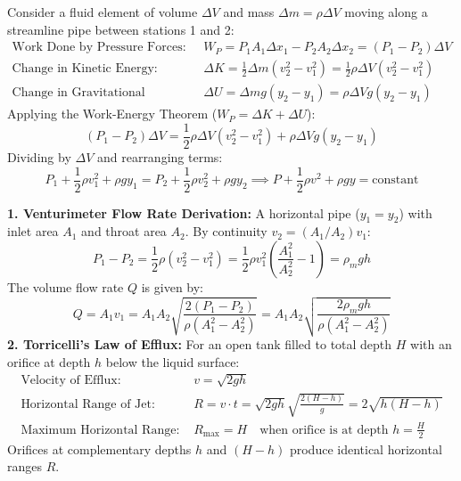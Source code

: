 \documentclass[10pt,a4paper]{article}
\begin{document}
\begin{formulabox}
Consider a fluid element of volume $\Delta V$ and mass $\Delta m = \rho\Delta V$ moving along a streamline pipe between stations 1 and 2:
\begin{align}
  \text{Work Done by Pressure Forces: } &W_P = P_1 A_1 \Delta x_1 - P_2 A_2 \Delta x_2 = (P_1 - P_2)\Delta V \\
  \text{Change in Kinetic Energy: } &\Delta K = \frac{1}{2}\Delta m(v_2^2 - v_1^2) = \frac{1}{2}\rho\Delta V(v_2^2 - v_1^2) \\
  \text{Change in Gravitational Potential Energy: } &\Delta U = \Delta m g(y_2 - y_1) = \rho\Delta V g(y_2 - y_1)
\end{align}
Applying the Work-Energy Theorem ($W_P = \Delta K + \Delta U$):
\begin{equation}
  (P_1 - P_2)\Delta V = \frac{1}{2}\rho\Delta V(v_2^2 - v_1^2) + \rho\Delta V g(y_2 - y_1)
\end{equation}
Dividing by $\Delta V$ and rearranging terms:
\begin{equation}
  P_1 + \frac{1}{2}\rho v_1^2 + \rho g y_1 = P_2 + \frac{1}{2}\rho v_2^2 + \rho g y_2 \implies P + \frac{1}{2}\rho v^2 + \rho g y = \text{constant}
\end{equation}
\end{formulabox}

\begin{formulabox}
\textbf{1. Venturimeter Flow Rate Derivation:}
A horizontal pipe ($y_1 = y_2$) with inlet area $A_1$ and throat area $A_2$. By continuity $v_2 = (A_1/A_2)v_1$:
\begin{equation}
  P_1 - P_2 = \frac{1}{2}\rho(v_2^2 - v_1^2) = \frac{1}{2}\rho v_1^2\left(\frac{A_1^2}{A_2^2} - 1\right) = \rho_m g h
\end{equation}
The volume flow rate $Q$ is given by:
\begin{equation}
  Q = A_1 v_1 = A_1 A_2 \sqrt{\frac{2(P_1 - P_2)}{\rho(A_1^2 - A_2^2)}} = A_1 A_2 \sqrt{\frac{2\rho_m g h}{\rho(A_1^2 - A_2^2)}}
\end{equation}
\textbf{2. Torricelli's Law of Efflux:}
For an open tank filled to total depth $H$ with an orifice at depth $h$ below the liquid surface:
\begin{align}
  \text{Velocity of Efflux: } &v = \sqrt{2gh} \\
  \text{Horizontal Range of Jet: } &R = v \cdot t = \sqrt{2gh}\sqrt{\frac{2(H-h)}{g}} = 2\sqrt{h(H-h)} \\
  \text{Maximum Horizontal Range: } &R_{\max} = H \quad \text{when orifice is at depth } h = \frac{H}{2}
\end{align}
Orifices at complementary depths $h$ and $(H-h)$ produce identical horizontal ranges $R$.
\end{formulabox}
\end{document}
